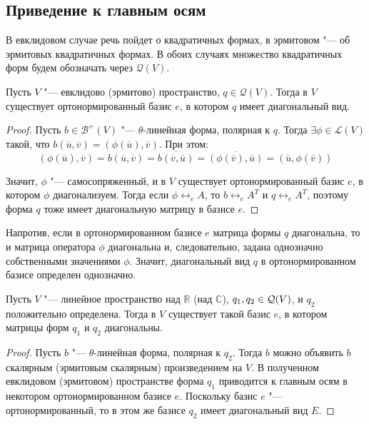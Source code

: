 \subsection{Приведение к главным осям}

В евклидовом случае речь пойдет о квадратичных формах, в эрмитовом "--- об эрмитовых квадратичных формах. В обоих случаях множество квадратичных форм будем обозначать через $\mathcal{Q}(V)$.

\begin{theorem}
	Пусть $V$ "--- евклидово (эрмитово) пространство,  $q \in \mathcal{Q}(V)$. Тогда в $V$ существует ортонормированный базис $e$, в котором $q$ имеет диагональный вид.
\end{theorem}

\begin{proof}
	Пусть $b \in \mathcal{B}^+(V)$ "--- $\theta$-линейная форма, полярная к $q$. Тогда $\exists \phi \in \mathcal{L}(V)$ такой, что $b(\overline{u}, \overline{v}) = (\phi(\overline{u}), \overline{v})$. При этом:
	\[(\phi(\overline{u}), \overline{v}) = b(\overline{u}, \overline{v}) = \overline{b(\overline{v}, \overline{u})} = \overline{(\phi(\overline{v}), \overline{u})} = (\overline{u}, \phi(\overline{v}))\]
	
	Значит, $\phi$ "--- самосопряженный, и в $V$ существует ортонормированный базис $e$, в котором $\phi$ диагонализуем. Тогда если $\phi \leftrightarrow_e A$, то $b \leftrightarrow_e A^T$ и $q \leftrightarrow_e A^T$, поэтому форма $q$ тоже имеет диагональную матрицу в базисе $e$.
\end{proof}

\begin{note}
	Напротив, если в ортонормированном базисе $e$ матрица формы $q$ диагональна, то и матрица оператора $\phi$ диагональна и, следовательно, задана однозначно собственными значениями $\phi$. Значит, диагональный вид $q$ в ортонормированном базисе определен однозначно.
\end{note}

\begin{theorem}
	Пусть $V$ "--- линейное пространство над $\mathbb{R}$ (над $\mathbb{C}$), $q_1, q_2 \hm{\in} \mathcal{Q}(V)$, и $q_2$ положительно определена. Тогда в $V$ существует такой базис $e$, в котором матрицы форм $q_1$ и $q_2$ диагональны.
\end{theorem}

\begin{proof}
	Пусть $b$ "--- $\theta$-линейная форма, полярная к $q_2$. Тогда $b$  можно объявить $b$ скалярным (эрмитовым скалярным) произведением на $V$. В полученном евклидовом (эрмитовом) пространстве форма $q_1$ приводится к главным осям в некотором ортонормированном базисе $e$. Поскольку базис $e$ "--- ортонормированный, то в этом же базисе $q_2$ имеет диагональный вид $E$.
\end{proof}


